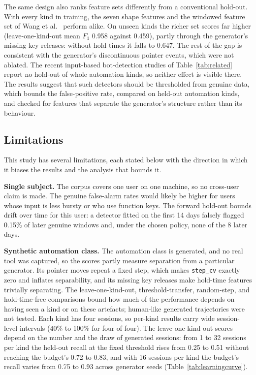 \documentclass[sensors,article,submit,pdftex,oneauthor]{Definitions/mdpi}
\begin{document}
The same design also ranks feature sets differently from a conventional hold-out. With every kind in training, the seven shape features and the windowed feature set of Wang et al.~\cite{wang2022siurua} perform alike. On unseen kinds the richer set scores far higher (leave-one-kind-out mean $F_1$ 0.958 against 0.459), partly through the generator's missing key releases: without hold times it falls to 0.647. The rest of the gap is consistent with the generator's discontinuous pointer events, which were not ablated. The recent input-based bot-detection studies of Table~\ref{tab:related} report no hold-out of whole automation kinds, so neither effect is visible there. The results suggest that such detectors should be thresholded from genuine data, which bounds the false-positive rate, compared on held-out automation kinds, and checked for features that separate the generator's structure rather than its behaviour.

\subsection{Limitations}
This study has several limitations, each stated below with the direction in which it biases the results and the analysis that bounds it.

\textbf{Single subject.} The corpus covers one user on one machine, so no cross-user claim is made. The genuine false-alarm rates would likely be higher for users whose input is less bursty or who use function keys. The forward hold-out bounds drift over time for this user: a detector fitted on the first 14 days falsely flagged 0.15\% of later genuine windows and, under the chosen policy, none of the 8 later days.

\textbf{Synthetic automation class.} The automation class is generated, and no real tool was captured, so the scores partly measure separation from a particular generator. Its pointer moves repeat a fixed step, which makes \texttt{step\_cv} exactly zero and inflates separability, and its missing key releases make hold-time features trivially separating. The leave-one-kind-out, threshold-transfer, random-step, and hold-time-free comparisons bound how much of the performance depends on having seen a kind or on these artefacts; human-like generated trajectories were not tested. Each kind has four sessions, so per-kind results carry wide session-level intervals (40\% to 100\% for four of four). The leave-one-kind-out scores depend on the number and the draw of generated sessions: from 1 to 32 sessions per kind the held-out recall at the fixed threshold rises from 0.25 to 0.51 without reaching the budget's 0.72 to 0.83, and with 16 sessions per kind the budget's recall varies from 0.75 to 0.93 across generator seeds (Table~\ref{tab:learningcurve}).
\end{document}
